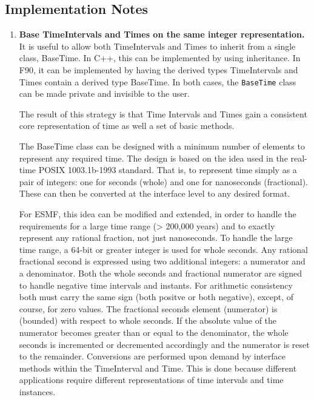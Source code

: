 
\subsection{Implementation Notes}
\begin{enumerate}

\item {\bf Base TimeIntervals and Times on the same integer representation.} 
It is useful to allow both TimeIntervals and Times to 
inherit from a single class, BaseTime.  In C++, this can be
implemented by using inheritance.  In F90, it can be implemented
by having the derived types TimeIntervals and Times
contain a derived type BaseTime.  In both cases, the 
{\tt BaseTime} class can be made private and invisible to the user.

The result of this strategy is that Time Intervals and 
Times gain a consistent core representation of time as well a set
of basic methods.

The BaseTime class can be designed with a minimum number of elements
to represent any required time.  The design is based on the idea used
in the real-time POSIX 1003.1b-1993 standard.  That is, to represent
time simply as a pair of integers: one for seconds (whole) and one for
nanoseconds (fractional).  These can then be converted at the interface
level to any desired format.

For ESMF, this idea can be modified and extended, in order to handle the
requirements for a large time range (> 200,000 years) and to exactly
represent any rational fraction, not just nanoseconds.  To handle the
large time range, a 64-bit or greater integer is used for whole seconds.
Any rational fractional second is expressed using two additional integers:
a numerator and a denominator.  Both the whole seconds and fractional
numerator are signed to handle negative time intervals and instants.
For arithmetic consistency both must carry the same sign (both positve
or both negative), except, of course, for zero values.  The fractional
seconds element (numerator) is 
(bounded) with respect to whole seconds. If the absolute value of the
numerator becomes greater than or equal to the denominator, the whole
seconds is incremented or decremented accordingly and the numerator is
reset to the remainder.  Conversions are performed upon demand by
interface methods within the TimeInterval and
Time.  This is done because different applications require different
representations of time intervals and time instances.


\end{enumerate}
